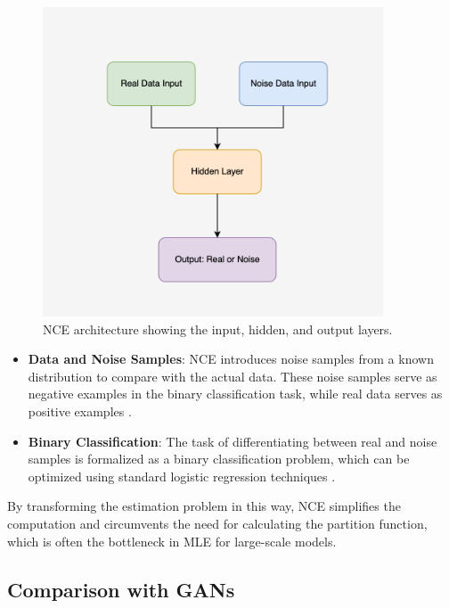 \begin{figure}[H]
    \centering
    \includegraphics[width=0.9\textwidth]{./Images/NCE_structure.jpg}
    \caption{NCE architecture showing the input, hidden, and output layers.}
    \label{fig:NCE_structure}
\end{figure}

\begin{itemize}
    \item \textbf{Data and Noise Samples}: NCE introduces noise samples from a known distribution to compare with the actual data. These noise samples serve as negative examples in the binary classification task, while real data serves as positive examples \citep{10.48550/arxiv.1711.00658}.
    \item \textbf{Binary Classification}: The task of differentiating between real and noise samples is formalized as a binary classification problem, which can be optimized using standard logistic regression techniques \citep{10.18653/v1/e17-2003}.
\end{itemize}

By transforming the estimation problem in this way, NCE simplifies the computation and circumvents the need for calculating the partition function, which is often the bottleneck in MLE for large-scale models.

\subsection{Comparison with GANs}

